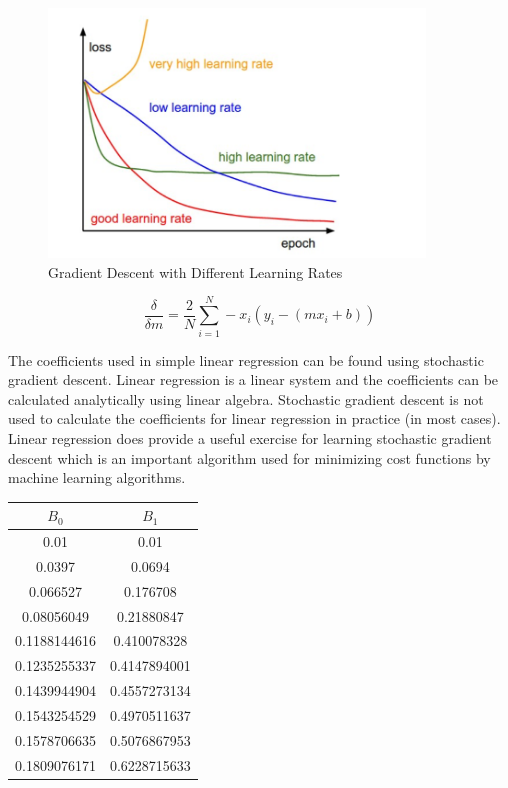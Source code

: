 \begin{figure}[H]
    \centering
    \includegraphics[width=10cm]{images/gradient-descent-different-learning-rates.png}
    \caption{Gradient Descent with Different Learning Rates}
\end{figure}

\pagebreak

\[
    \frac{\delta}{\delta m} = \frac{2}{N} \sum_{i=1}^{N} - x_{i}(y_{i} - (mx_{i} +b))
\]

The coefficients used in simple linear regression can be found using stochastic gradient descent. Linear regression is a linear system and the coefficients can be calculated analytically using linear algebra. Stochastic gradient descent is not used to calculate the coefficients for linear regression in practice (in most cases). Linear regression does provide a useful exercise for learning stochastic gradient descent which is an important algorithm used for minimizing cost functions by machine learning algorithms.

\begin{center}
\begin{tabular}{|c|c|}
    \hline
    $B_{0}$ & $B_{1}$ \\ [0.5ex]
    \hline\hline
    0.01 & 0.01 \\
    \hline
    0.0397 & 0.0694 \\
    \hline
    0.066527 & 0.176708 \\
    \hline
    0.08056049 & 0.21880847 \\
    \hline
    0.1188144616 & 0.410078328 \\
    \hline
    0.1235255337 & 0.4147894001 \\
    \hline
    0.1439944904 & 0.4557273134 \\
    \hline
    0.1543254529 & 0.4970511637 \\
    \hline
    0.1578706635 & 0.5076867953 \\
    \hline
    0.1809076171 & 0.6228715633 \\
    \hline
\end{tabular}
\label{tbl:nicetablelesstable}
\end{center}


